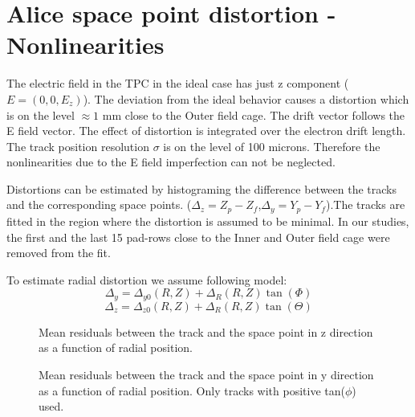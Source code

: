 \documentclass{elsart}
\begin{document}
\section{ Alice space point distortion - Nonlinearities}


The electric field in the TPC in the ideal case has just z component ($E=(0,0,E_z)$).
The deviation from the ideal behavior causes a distortion which is on the level  $\approx1$ mm
close to the Outer field cage.
The drift vector follows the E field vector. The effect of distortion is integrated over the 
electron drift length. The track position resolution $\sigma$ is on the level of 100 microns.
Therefore the nonlinearities due to the E field imperfection can not be neglected.

Distortions can be estimated by histograming the difference between the tracks and the corresponding
 space points. ($\Delta_z= Z_p-Z_f$,$\Delta_y= Y_p-Y_f$).The tracks are fitted in the region where the distortion is assumed to be minimal.
In our studies, the first and the last 15 pad-rows close to the Inner and Outer field cage were removed from the fit.

To estimate radial distortion we assume following model:
\begin{equation}
\Delta_y=\Delta_{y0}(R,Z)+\Delta_R(R,Z)\tan(\Phi) 
\end{equation}
\begin{equation}
\Delta_z=\Delta_{z0}(R,Z)+\Delta_R(R,Z)\tan(\Theta)
\end{equation}

\begin{figure}
  \centering{}	
  \centering{}
  \centering{}
  \caption{Mean residuals between the track and the space point in z direction as a function of radial position. }
  \label{figLocalZDistortion}
\end{figure}

\begin{figure}
  \centering{}	
  \centering{}
  \centering{}
  \caption{Mean residuals between the track and the space point in y direction as a function of radial position. Only tracks with positive tan($\phi$) used. }
  \label{figLocalYDistortion}
\end{figure}
\end{document}
